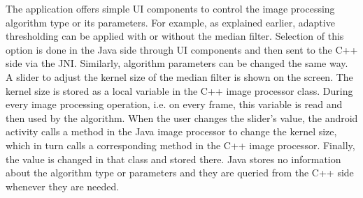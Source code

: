 The application offers simple UI components to control the image processing algorithm type or its parameters. For example, as explained earlier, adaptive thresholding can be applied with or without the median filter. Selection of this option is done in the Java side through UI components and then sent to the C++ side via the JNI. Similarly, algorithm parameters can be changed the same way. A slider to adjust the kernel size of the median filter is shown on the screen. The kernel size is stored as a local variable in the C++ image processor class. During every image processing operation, i.e. on every frame, this variable is read and then used by the algorithm. When the user changes the slider’s value, the android activity calls a method in the Java image processor to change the kernel size, which in turn calls a corresponding method in the C++ image processor. Finally, the value is changed in that class and stored there. Java stores no information about the algorithm type or parameters and they are queried from the C++ side whenever they are needed. 






 
